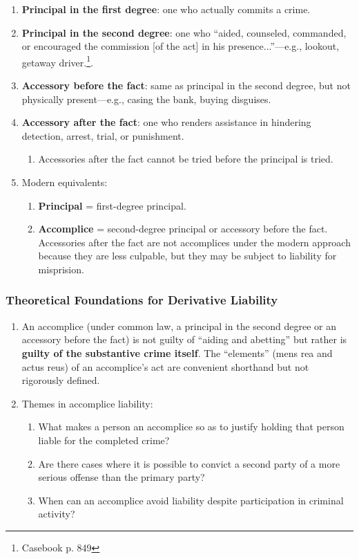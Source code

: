 \begin{enumerate}
    \item \textbf{Principal in the first degree}: one who actually commits a 
    crime.
    \item \textbf{Principal in the second degree}: one who ``aided, counseled, 
    commanded, or encouraged the commission [of the act] in his 
    presence...''---e.g., lookout, getaway driver.\footnote{Casebook p. 849}.
    \item \textbf{Accessory before the fact}: same as principal in the second 
    degree, but not physically present---e.g., casing the bank, buying 
    disguises.
    \item \textbf{Accessory after the fact}: one who renders assistance in 
    hindering detection, arrest, trial, or punishment.
    \begin{enumerate}
        \item Accessories after the fact cannot be tried before the principal 
        is tried.
    \end{enumerate}
    \item Modern equivalents:
    \begin{enumerate}
        \item \textbf{Principal} = first-degree principal.
        \item \textbf{Accomplice} = second-degree principal or accessory 
        before the fact. Accessories after the fact are not accomplices under 
        the modern approach because they are less culpable, but they may be 
        subject to liability for misprision.
    \end{enumerate}
\end{enumerate}

\subsubsection{Theoretical Foundations for Derivative Liability}

\begin{enumerate}
    \item An accomplice (under common law, a principal in the second degree or 
    an accessory before the fact) is not guilty of ``aiding and abetting'' but 
    rather is \textbf{guilty of the substantive crime itself}. The 
    ``elements'' (mens rea and actus reus) of an accomplice's act are 
    convenient shorthand but not rigorously defined.
    \item Themes in accomplice liability:
    \begin{enumerate}
        \item What makes a person an accomplice so as to justify holding that 
        person liable for the completed crime?
        \item Are there cases where it is possible to convict a second party of a 
        more serious offense than the primary party?
        \item When can an accomplice avoid liability despite participation in 
        criminal activity?
    \end{enumerate}
\end{enumerate}

